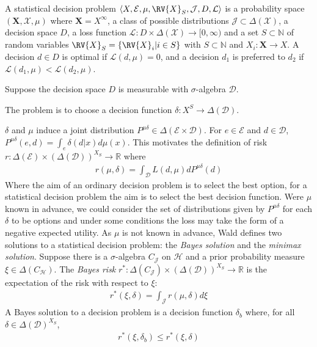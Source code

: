 \begin{definition}
A statistical decision problem $\langle X,\mathcal{E},\mu,\RV{X}_{S},\mathcal{J},D,\mathcal{L}\rangle$ is a probability space $(\mathbf{X}, \mathcal{X},\mu)$ where $\mathbf{X}=X^\infty$, a class of possible distributions $\mathcal{J}\subset \Delta(\mathcal{X})$, a decision space $D$, a loss function $\mathcal{L}:D\times \Delta(\mathcal{X})\to [0,\infty)$ and a set $S\subset \mathbb{N}$ of random variables $\RV{X}_{S}=\{\RV{X}_i|i\in S\}$ with $S\subset\mathbb{N}$ and $X_i:\mathbf{X}\to X$. A decision $d\in D$ is optimal if $\mathcal{L}(d,\mu)=0$, and a decision $d_1$ is preferred to $d_2$ if $\mathcal{L}(d_1,\mu)<\mathcal{L}(d_2,\mu)$.

Suppose the decision space $D$ is measurable with $\sigma$-algebra $\mathcal{D}$.

The problem is to choose a decision function $\delta:X^S\to \Delta(\mathcal{D})$.
\end{definition}

$\delta$ and $\mu$ induce a joint distribution $P^{\mu\delta}\in \Delta(\mathcal{E}\times \mathcal{D})$. For $e\in \mathcal{E}$ and $d\in \mathcal{D}$, $P^{\mu\delta}(e,d)=\int_e \delta(d|x)d\mu(x)$. This motivates the definition of risk $r:\Delta(\mathcal{E})\times (\Delta(\mathcal{D}))^{X_S}\to \mathbb{R}$ where
\begin{align}
    r(\mu,\delta) = \int_{\mathcal{D}} L(d,\mu)dP^{\mu\delta}(d)
\end{align}
Where the aim of an ordinary decision problem is to select the best option, for a statistical decision problem the aim is to select the best decision function. Were $\mu$ known in advance, we could consider the set of distributions given by $P^{\mu\delta}$ for each $\delta$ to be options and under some conditions the loss may take the form of a negative expected utility. As $\mu$ is not known in advance, Wald defines two solutions to a statistical decision problem: the \emph{Bayes solution} and the \emph{minimax solution}. Suppose there is a $\sigma$-algebra $C_{\mathcal{J}}$ on $\mathcal{H}$ and a prior probability measure $\xi\in \Delta(C_{\mathcal{H}})$. The \emph{Bayes risk} $r^*:\Delta(C_{\mathcal{J}})\times (\Delta(\mathcal{D}))^{X_S}\to \mathbb{R}$ is the expectation of the risk with respect to $\xi$:
\begin{align}
    r^*(\xi,\delta) = \int_{\mathcal{J}} r(\mu,\delta)d\xi
\end{align}
A Bayes solution to a decision problem is a decision function $\delta_b$ where, for all $\delta\in \Delta(\mathcal{D})^{X_S}$,
\begin{align}
    r^*(\xi,\delta_b)\leq r^*(\xi,\delta)
\end{align}

